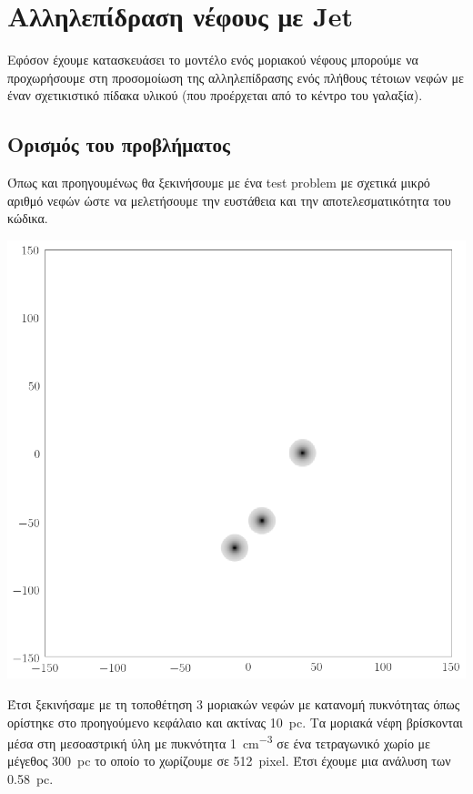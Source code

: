 \section{Αλληλεπίδραση νέφους με Jet}
	Εφόσον έχουμε κατασκευάσει το μοντέλο ενός μοριακού νέφους μπορούμε να προχωρήσουμε στη προσομοίωση της αλληλεπίδρασης ενός πλήθους τέτοιων νεφών με έναν σχετικιστικό πίδακα υλικού (που προέρχεται από το κέντρο του γαλαξία).
	
\subsection{Ορισμός του προβλήματος}
	Όπως και προηγουμένως θα ξεκινήσουμε με ένα test problem με σχετικά μικρό αριθμό νεφών ώστε να μελετήσουμε την ευστάθεια και την αποτελεσματικότητα του κώδικα.
	
\begin{marginfigure}
	\centering
	\includegraphics[width=1\linewidth]{DataImages/Jet0}
	\caption{}
	\label{fig:jet0}
\end{marginfigure}

	Έτσι ξεκινήσαμε με τη τοποθέτηση 3 μοριακών νεφών με κατανομή πυκνότητας όπως ορίστηκε στο προηγούμενο κεφάλαιο και ακτίνας \SI{10}{pc}. Τα μοριακά νέφη βρίσκονται μέσα στη μεσοαστρική ύλη με πυκνότητα \SI{1}{cm^{-3}} σε ένα τετραγωνικό χωρίο με μέγεθος \SI{300}{pc} το οποίο το χωρίζουμε σε \SI{512}{pixel}. Έτσι έχουμε μια ανάλυση των \SI{0.58}{pc}. 
	
